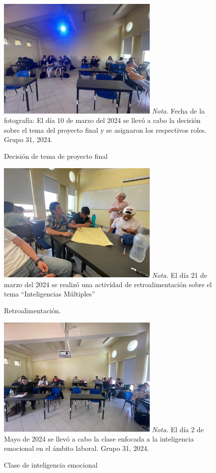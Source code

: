 \begin{figure}
    \caption{Decisi\'on de tema de proyecto final\label{fig:No.1}}
    \includegraphics[width=0.7\textwidth]{./assets/img/imagen2DH.jpeg}
	\textit{Nota.} Fecha de la fotograf\'ia: El d\'ia 10 de marzo del 2024 se llev\'o a cabo la decisi\'on sobre el tema del proyecto final y se asignaron los respectivos roles. Grupo 31, 2024.
\end{figure}

\begin{figure}
    \caption{Retroalimentaci\'on.\label{fig:No.2}}
    \includegraphics[width=0.7\textwidth]{./assets/img/imagen1DH.jpeg}
	\textit{Nota.} El d\'ia 21 de marzo del 2024 se realiz\'o una actividad de retroalimentaci\'on sobre el tema ``Inteligencias M\'ultiples''
\end{figure}

\begin{figure}
    \caption{Clase de inteligencia emocional\label{fig:No.3}}
    \includegraphics[width=0.7\textwidth]{./assets/img/imagen3DH.jpeg}
	\textit{Nota.} El d\'ia 2 de Mayo de 2024 se llev\'o a cabo la clase enfocada a la inteligencia emocional en el ámbito laboral. Grupo 31, 2024.
\end{figure}

